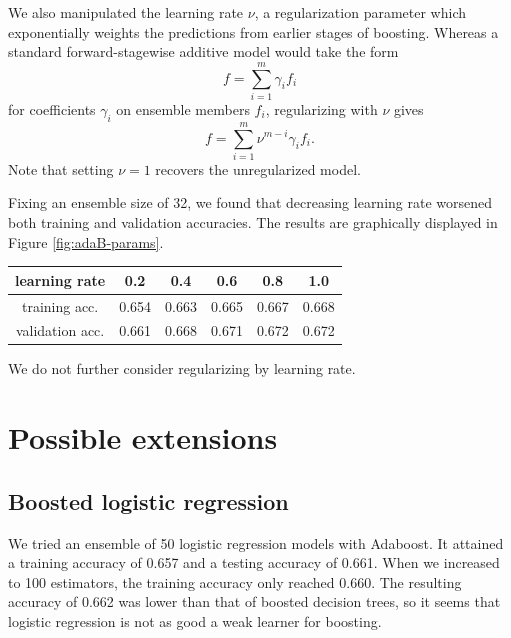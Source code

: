 \documentclass{article}
\begin{document}
\begin{multicols}{2}
We also manipulated the learning rate $\nu$,
a regularization parameter which exponentially weights the predictions
from earlier stages of boosting.
Whereas a standard forward-stagewise additive model
would take the form
\begin{equation}
    f = \sum_{i=1}^m \gamma_i f_i
\end{equation}
for coefficients $\gamma_i$ on ensemble members $f_i$,
regularizing with $\nu$ gives
\begin{equation}
    f = \sum_{i=1}^m \nu^{m - i}\gamma_i f_i.
\end{equation}
Note that setting $\nu = 1$ recovers the unregularized model.

Fixing an ensemble size of 32,
we found that decreasing learning rate worsened both training
and validation accuracies.
The results are graphically displayed in Figure \ref{fig:adaB-params}.

\begin{center}
    \begin{tabular}{c|ccccc}
        learning rate &
          0.2 & 0.4 & 0.6 & 0.8 & 1.0 \\\hline
        training acc. &
          0.654& 0.663& 0.665& 0.667& 0.668\\
        validation acc. &
          0.661& 0.668& 0.671& 0.672& 0.672
    \end{tabular}
\end{center}

We do not further consider regularizing by learning rate.

\section{Possible extensions}

\subsection{Boosted logistic regression}

We tried an ensemble of 50 
logistic regression models with Adaboost.
It attained a training accuracy of 0.657
and a testing accuracy of 0.661.
When we increased to 100 estimators,
the training accuracy only reached 0.660.
The resulting accuracy of 0.662
was lower than that of boosted decision trees,
so it seems that
logistic regression is not as good a
weak learner for boosting.
%
%



\end{multicols}
\end{document}
